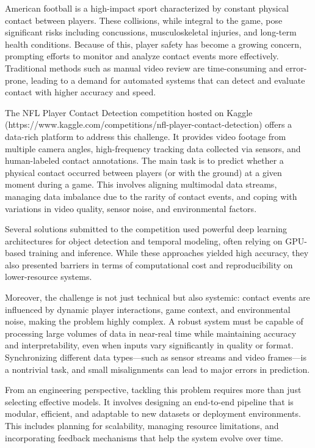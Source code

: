 \documentclass[conference]{IEEEtran}
\begin{document}
	American football is a high-impact sport characterized by constant physical contact between players. These collisions, while integral to the game, pose significant risks including concussions, musculoskeletal injuries, and long-term health conditions. Because of this, player safety has become a growing concern, prompting efforts to monitor and analyze contact events more effectively. Traditional methods such as manual video review are time-consuming and error-prone, leading to a demand for automated systems that can detect and evaluate contact with higher accuracy and speed.
	
	The NFL Player Contact Detection competition hosted on Kaggle (https://www.kaggle.com/competitions/nfl-player-contact-detection) offers a data-rich platform to address this challenge. It provides video footage from multiple camera angles, high-frequency tracking data collected via sensors, and human-labeled contact annotations. The main task is to predict whether a physical contact occurred between players (or with the ground) at a given moment during a game. This involves aligning multimodal data streams, managing data imbalance due to the rarity of contact events, and coping with variations in video quality, sensor noise, and environmental factors.
	
	Several solutions submitted to the competition used powerful deep learning architectures for object detection and temporal modeling, often relying on GPU-based training and inference. While these approaches yielded high accuracy, they also presented barriers in terms of computational cost and reproducibility on lower-resource systems.
	
	Moreover, the challenge is not just technical but also systemic: contact events are influenced by dynamic player interactions, game context, and environmental noise, making the problem highly complex. A robust system must be capable of processing large volumes of data in near-real time while maintaining accuracy and interpretability, even when inputs vary significantly in quality or format. Synchronizing different data types—such as sensor streams and video frames—is a nontrivial task, and small misalignments can lead to major errors in prediction.
	
	From an engineering perspective, tackling this problem requires more than just selecting effective models. It involves designing an end-to-end pipeline that is modular, efficient, and adaptable to new datasets or deployment environments. This includes planning for scalability, managing resource limitations, and incorporating feedback mechanisms that help the system evolve over time.
	
\end{document}
